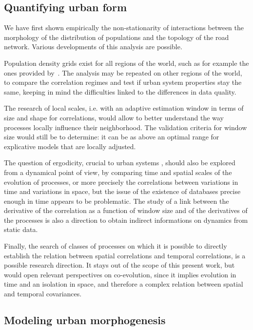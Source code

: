 \documentclass[11pt]{article}
\begin{document}
\subsection{Quantifying urban form}

We have first shown empirically the non-stationarity of interactions between the morphology of the distribution of populations and the topology of the road network. Various developments of this analysis are possible.

Population density grids exist for all regions of the world, such as for example the ones provided by~\cite{10.1371/journal.pone.0107042}. The analysis may be repeated on other regions of the world, to compare the correlation regimes and test if urban system properties stay the same, keeping in mind the difficulties linked to the differences in data quality.

The research of local scales, i.e. with an adaptive estimation window in terms of size and shape for correlations, would allow to better understand the way processes locally influence their neighborhood. The validation criteria for window size would still be to determine: it can be as above an optimal range for explicative models that are locally adjusted.

The question of ergodicity, crucial to urban systems \citep{pumain2012urban}, should also be explored from a dynamical point of view, by comparing time and spatial scales of the evolution of processes, or more precisely the correlations between variations in time and variations in space, but the issue of the existence of databases precise enough in time appears to be problematic. The study of a link between the derivative of the correlation as a function of window size and of the derivatives of the processes is also a direction to obtain indirect informations on dynamics from static data.


Finally, the search of classes of processes on which it is possible to directly establish the relation between spatial correlations and temporal correlations, is a possible research direction. It stays out of the scope of this present work, but would open relevant perspectives on co-evolution, since it implies evolution in time and an isolation in space, and therefore a complex relation between spatial and temporal covariances.

\subsection{Modeling urban morphogenesis}
\end{document}
